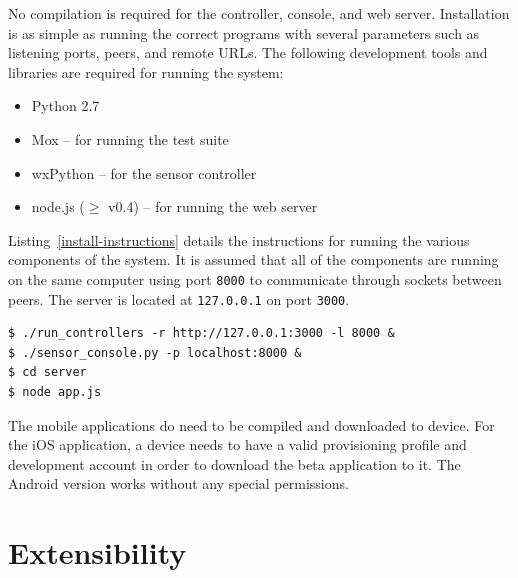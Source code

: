 \documentclass{article}
\begin{document}
No compilation is required for the controller, console, and web server.
Installation is as simple as running the correct programs with several
parameters such as listening ports, peers, and remote URLs. The following
development tools and libraries are required for running the
system:
\begin{itemize}
\item Python 2.7 
\item Mox -- for running the test suite
\item wxPython -- for the sensor controller
\item node.js ($\ge$ v0.4) -- for running the web server
\end{itemize}

Listing~\ref{install-instructions} details the instructions for running the
various components of the system. It is assumed that all of the components are
running on the same computer using port \texttt{8000} to communicate through
sockets between peers. The server is located at \texttt{127.0.0.1} on port
\texttt{3000}.

\begin{lstlisting}
$ ./run_controllers -r http://127.0.0.1:3000 -l 8000 & 
$ ./sensor_console.py -p localhost:8000 &
$ cd server
$ node app.js
\end{lstlisting}

The mobile applications do need to be compiled and downloaded to device. For
the iOS application, a device needs to have a valid provisioning profile and
development account in order to download the beta application to it. The
Android version works without any special permissions.

\section{Extensibility} %
\end{document}
